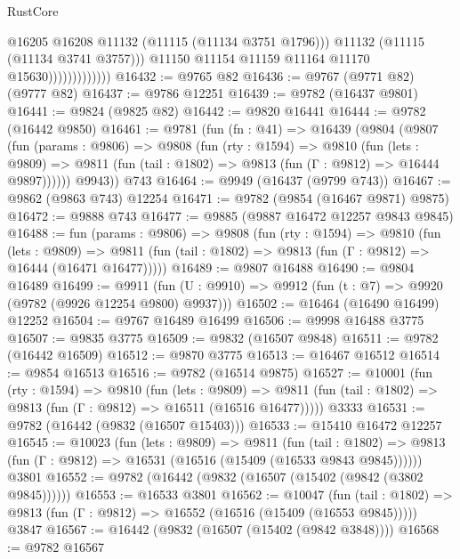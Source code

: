 \begin{lexlean}{RustCore}
\begin{coremodule}
                                  @16205
                                  @16208
                                  @11132
                                  (@11115 (@11134 @3751 @1796)))
                                @11132
                                (@11115 (@11134 @3741 @3757)))
                              @11150
                              @11154
                              @11159
                              @11164
                              @11170
                              @15630)))))))))))))
@16432 := @9765 @82
@16436 := @9767 (@9771 @82) (@9777 @82)
@16437 := @9786 @12251
@16439 := @9782 (@16437 @9801)
@16441 := @9824 (@9825 @82)
@16442 := @9820 @16441
@16444 := @9782 (@16442 @9850)
@16461 := @9781
    (fun (fn : @41) =>
    @16439
      (@9804
        (@9807
          (fun (params : @9806) =>
          @9808
            (fun (rty : @1594) =>
            @9810
              (fun (lets : @9809) =>
              @9811 (fun (tail : @1802) => @9813 (fun (Γ : @9812) => @16444 @9897))))))
        @9943))
    @743
@16464 := @9949 (@16437 (@9799 @743))
@16467 := @9862 (@9863 @743) @12254
@16471 := @9782 (@9854 (@16467 @9871) @9875)
@16472 := @9888 @743
@16477 := @9885 (@9887 @16472 @12257 @9843 @9845)
@16488 := fun (params : @9806) =>
  @9808
    (fun (rty : @1594) =>
    @9810
      (fun (lets : @9809) =>
      @9811 (fun (tail : @1802) => @9813 (fun (Γ : @9812) => @16444 (@16471 @16477)))))
@16489 := @9807 @16488
@16490 := @9804 @16489
@16499 := @9911
    (fun (U : @9910) => @9912 (fun (t : @7) => @9920 (@9782 (@9926 @12254 @9800) @9937)))
@16502 := @16464 (@16490 @16499) @12252
@16504 := @9767 @16489 @16499
@16506 := @9998 @16488 @3775
@16507 := @9835 @3775
@16509 := @9832 (@16507 @9848)
@16511 := @9782 (@16442 @16509)
@16512 := @9870 @3775
@16513 := @16467 @16512
@16514 := @9854 @16513
@16516 := @9782 (@16514 @9875)
@16527 := @10001
    (fun (rty : @1594) =>
    @9810
      (fun (lets : @9809) =>
      @9811 (fun (tail : @1802) => @9813 (fun (Γ : @9812) => @16511 (@16516 @16477)))))
    @3333
@16531 := @9782 (@16442 (@9832 (@16507 @15403)))
@16533 := @15410 @16472 @12257
@16545 := @10023
    (fun (lets : @9809) =>
    @9811
      (fun (tail : @1802) =>
      @9813 (fun (Γ : @9812) => @16531 (@16516 (@15409 (@16533 @9843 @9845))))))
    @3801
@16552 := @9782 (@16442 (@9832 (@16507 (@15402 (@9842 (@3802 @9845))))))
@16553 := @16533 @3801
@16562 := @10047
    (fun (tail : @1802) => @9813 (fun (Γ : @9812) => @16552 (@16516 (@15409 (@16553 @9845)))))
    @3847
@16567 := @16442 (@9832 (@16507 (@15402 (@9842 @3848))))
@16568 := @9782 @16567

\end{coremodule}
\end{lexlean}

